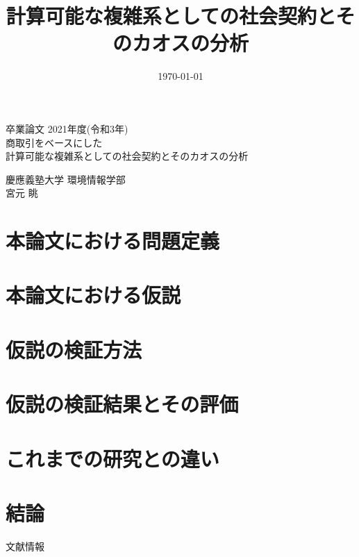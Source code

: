 \documentclass[a4j]{ujreport}
\title{計算可能な複雑系としての社会契約とそのカオスの分析}
\date{\today}
\def\title{商取引をベースにした\\計算可能な複雑系としての社会契約とそのカオスの分析}
\def\author{宮元 眺}
\def\dept{慶應義塾大学 環境情報学部}
\begin{document}
\begin{titlepage}
  \begin{center}
    \begin{large}
      卒業論文   2021年度(令和3年)\\
      \vspace{24pt}
      \title
    \end{large}
  \end{center}
  \vspace{40em}
  \begin{flushright}
    \large \dept\\
    \author
  \end{flushright}
\end{titlepage}



\tableofcontents\thispagestyle{plain}



\chapter{本論文における問題定義}
\chapter{本論文における仮説}
\chapter{仮説の検証方法}
\chapter{仮説の検証結果とその評価}



\chapter{これまでの研究との違い}
\chapter{結論}


\begin{thebibliography}{数字}
   文献情報
\end{thebibliography}
\end{document}
